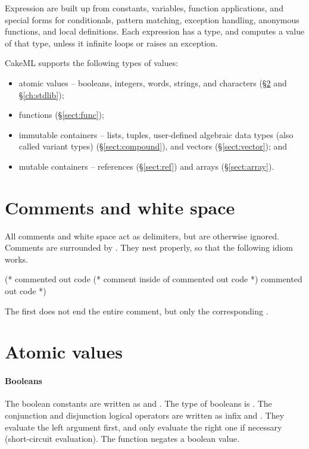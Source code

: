 \documentclass[12pt,a4paper]{book}
\begin{document}
Expression are built up from constants, variables, function applications, and
special forms for conditionals, pattern matching, exception handling, anonymous
functions, and local definitions. Each expression has a type, and computes a
value of that type, unless it infinite loops or raises an exception.

CakeML supports the following types of values:
\begin{itemize}
  \item atomic values -- booleans, integers, words, strings, and characters (\S\ref{sect:val} and \S\ref{ch:stdlib});
  \item functions (\S\ref{sect:func});
  \item immutable containers -- lists, tuples, user-defined algebraic data types (also called variant types) (\S\ref{sect:compound}), and vectors (\S\ref{sect:vector}); and
  \item mutable containers -- references (\S\ref{sect:ref}) and arrays (\S\ref{sect:array}).
\end{itemize}

\section{Comments and white space}
All comments and white space act as delimiters, but are otherwise ignored. Comments are surrounded by \smlinline{(* *)}. They nest properly, so that the following idiom works.\begin{smlcode}
(*
  commented out code
  (* comment inside of commented out code *)
  commented out code
*)
\end{smlcode}
The first \smlinline{*)} does not end the entire comment, but only the
corresponding \smlinline{(*}.


\section{Atomic values}
\label{sect:val}

\paragraph{Booleans} The boolean constants are written as  and
. The type of booleans is . The conjunction and
disjunction logical operators are written as infix  and
. They evaluate the left argument first, and only evaluate the
right one if necessary (short-circuit evaluation). The  function
negates a boolean value.
\end{document}
